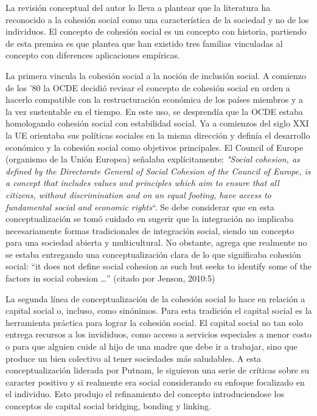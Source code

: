 \documentclass[
  12pt,
]{book}
\begin{document}
La revisión conceptual del autor lo lleva a plantear que la literatura
ha reconocido a la cohesión social como una característica de la
sociedad y no de los individuos. El concepto de cohesión social es un
concepto con historia, partiendo de esta premisa es que
\citet{jenson2010defining} plantea que han existido tres familias vinculadas al
concepto con diferences aplicaciones empíricas.

La primera vincula la cohesión social a la noción de inclusión social. A
comienzo de los '80 la OCDE decidió revisar el concepto de cohesión
social en orden a hacerlo compatible con la restructuración económica de
los países miembros y a la vez sustentable en el tiempo. En este uso, se
desprendía que la OCDE estaba homologando cohesión social con
estabilidad social. Ya a comienzos del siglo XXI la UE orientaba sus
políticas sociales en la misma dirección y definía el desarrollo
económico y la cohesión social como objetivos principales. El Council of
Europe (organismo de la Unión Europea) señalaba explícitamente: \emph{"Social
cohesion, as defined by the Directorate General of Social Cohesion of
the Council of Europe, is a concept that includes values and principles
which aim to ensure that all citizens, without discrimination and on an
equal footing, have access to fundamental social and economic rights}``.
Se debe considerar que en esta conceptualización se tomó cuidado en
sugerir que la integración no implicaba necesariamente formas
tradicionales de integración social, siendo un concepto para una
sociedad abierta y multicultural. No obstante, \citet{jenson2010defining}
agrega que realmente no se estaba entregando una conceptualización clara
de lo que significaba cohesión social: ``it does not define social
cohesion as such but seeks to identify some of the factors in social
cohesion \ldots{}'' (citado por Jenson, 2010:5)

La segunda línea de conceptualización de la cohesión social lo hace en
relación a capital social o, incluso, como sinónimos. Para esta
tradición el capital social es la herramienta práctica para lograr la
cohesión social. El capital social no tan solo entrega recursos a los
invididuos, como acceso a servicios especiales a menor costo o para que
alguien cuide al hijo de una madre que debe ir a trabajar, sino que
produce un bien colectivo al tener sociedades más saludables. A esta
conceptualización liderada por Putnam, le siguieron una serie de
críticas sobre su caracter positivo y si realmente era social
considerando su enfoque focalizado en el individuo. Esto produjo el
refinamiento del concepto introduciendose los conceptos de capital
social bridging, bonding y linking.
\end{document}
